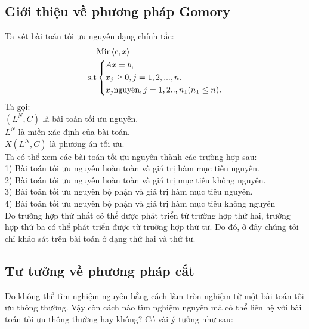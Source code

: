 \documentclass[12pt,a4paper]{report}
\begin{document}
\subsection{ Giới thiệu về phương pháp Gomory}
Ta xét bài toán tối ưu nguyên dạng chính tắc:\\
\begin{equation}\label{BTNchinhtac}
     \begin{split}
          & {\rm{Min}} \langle c,x \rangle\\
          \rm{s.t} &\left\{\begin{split}
            & Ax= b,\\
           & x_j \ge 0, j=1,2,...,n.\\
            & x_j \text{nguyên}, j=1,2..,n_1 (n_1\le n).\\
           \end{split}\right.
       \end{split}
   \end{equation}
   Ta gọi:\\
   $(L^N,C)$ là bài toán tối ưu nguyên.\\
$L^N$ là miền xác định của bài toán.\\
$X(L^N,C) $ là phương án tối ưu.\\
   Ta có thể xem các bài toán tối ưu nguyên thành các trường hợp sau:\\
   1) Bài toán tối ưu nguyên hoàn toàn và giá trị hàm mục tiêu nguyên.\\
   2) Bài toán tối ưu nguyên hoàn toàn và giá trị mục tiêu không nguyên.\\
   3) Bài toán tối ưu nguyên bộ phận và giá trị hàm mục tiêu nguyên.\\
   4) Bài toán tối ưu nguyên bộ phận và giá trị hàm mục tiêu không nguyên\\
   Do trường hợp thứ nhất có thể được phát triển từ trường hợp thứ hai, trường hợp thứ ba có thể phát triển được từ trường hợp thứ tư. Do đó, ở đây chúng tôi chỉ khảo sát trên bài toán ở dạng thứ hai và thứ tư.\\
\subsection{ Tư tưởng về phương pháp cắt}
Do không thể tìm nghiệm nguyên bằng cách làm tròn nghiệm từ một bài toán tối ưu thông thường. Vậy còn cách nào tìm nghiệm nguyên mà có thể liên hệ với bài toán tối ưu thông thường hay không? Có vài ý tưởng như sau:\\
\end{document}
